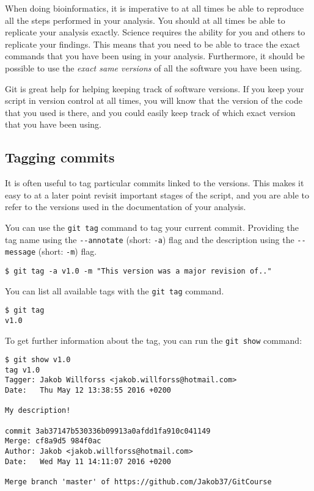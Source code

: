 \documentclass[../main/git_course_main.tex]{subfiles}
\begin{document}
When doing bioinformatics, it is imperative to at all times be able to reproduce all the steps
performed in your analysis. You should at all times be able to replicate your analysis exactly. Science requires the ability for you and others to replicate your findings.
This means that you need to be able to trace the exact commands that you have been using in your analysis.
Furthermore, it should be possible to use the \textit{exact same versions} of all the software you have been using.

Git is great help for helping keeping track of software versions. If you keep your script in version control at all times, you will know that the version
of the code that you used is there, and you could easily keep track of which exact version that you have been using.

\subsection{Tagging commits}

It is often useful to tag particular
commits linked to the versions. This makes it easy to at a later point revisit important stages of the script,
and you are able to refer to the versions used in the documentation of your analysis.

You can use the \verb$git tag$ command to tag your current commit. Providing the tag name using the \verb$--annotate$ (short: \verb$-a$) flag and the description using the \verb$--message$ (short: \verb$-m$) flag.

\begin{codebox}
\begin{lstlisting}
$ git tag -a v1.0 -m "This version was a major revision of.."
\end{lstlisting}
\end{codebox}

You can list all available tags with the \verb$git tag$ command.

\begin{codebox}
\begin{lstlisting}
$ git tag
v1.0
\end{lstlisting}
\end{codebox}

To get further information about the tag, you can run the \verb$git show$ command:

\begin{codebox}
\begin{lstlisting}
$ git show v1.0
tag v1.0
Tagger: Jakob Willforss <jakob.willforss@hotmail.com>
Date:   Thu May 12 13:38:55 2016 +0200

My description!

commit 3ab37147b530336b09913a0afdd1fa910c041149
Merge: cf8a9d5 984f0ac
Author: Jakob <jakob.willforss@hotmail.com>
Date:   Wed May 11 14:11:07 2016 +0200

Merge branch 'master' of https://github.com/Jakob37/GitCourse
\end{lstlisting}
\end{codebox}
\end{document}
